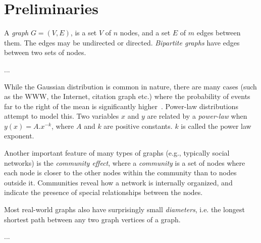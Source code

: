 \section{Preliminaries}
\label{sec:preliminaries}


A \emph{graph} $G = (V, E)$, is a set $V$ of $n$ nodes, and a set $E$ of $m$ edges between them. The edges may be undirected or directed. \emph{Bipartite graphs} have edges between two sets of nodes.

...

While the Gaussian distribution is common in nature, there are many cases (such as the WWW, the Internet, citation graph etc.) where the probability of events far to the right of the mean is significantly higher~\cite{Chakrabarti:2006:GML:1132952.1132954}. Power-law distributions attempt to model this. Two variables $x$ and $y$ are related by a \emph{power-law} when $y(x) = A.x^{-k}$, where $A$ and $k$ are positive constants. $k$ is called the power law exponent.

Another important feature of many types of graphs (e.g., typically social networks) is the \emph{community effect}, where a \emph{community} is a set of nodes where each node is closer to the other nodes within the community than to nodes outside it. Communities reveal how a network is internally organized, and indicate the presence of special relationships between the nodes.

Most real-world graphs also have surprisingly small \emph{diameters}, i.e. the longest shortest path between any two graph vertices of a graph. 

...